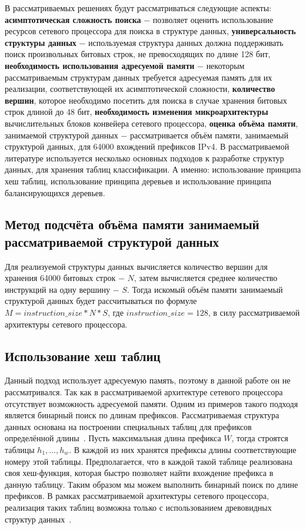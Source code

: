 \documentclass[conference]{IEEEtran}
\begin{document}
        В рассматриваемых решениях будут рассматриваться следующие аспекты:
        {\bf асимптотическая сложность поиска} $-$ позволяет оценить использование 
        ресурсов сетевого процессора для поиска в структуре данных,
        {\bf универсальность структуры данных} $-$ используемая структура данных
        должна поддерживать поиск произвольных битовых строк, не превосходящих по длине 128 бит,
        {\bf необходимость использования адресуемой памяти} $-$ некоторым рассматриваемым 
        структурам данных требуется адресуемая память для их реализации, 
        соответствующей их асимптотической сложности,
        {\bf количество вершин}, которое необходимо посетить для поиска
        в случае хранения битовых строк длиной до 48 бит,
        {\bf необходимость изменения микроархитектуры} вычислительных блоков конвейера 
        сетевого процессора,
        {\bf оценка объёма памяти}, занимаемой структурой данных $-$ рассматривается объём памяти, занимаемый структурой данных, для 64000 вхождений префиксов IPv4.
        В рассматриваемой литературе используется несколько основных подходов к разработке структур данных, 
        для хранения таблиц классификации. А именно: использование принципа хеш таблиц, использование принципа деревьев 
        и использование принципа балансирующихся деревьев.

    \subsection{Метод подсчёта объёма памяти занимаемый рассматриваемой структурой данных}
        Для реализуемой структуры данных вычисляется количество вершин для хранения 64000 битовых строк $-$ $N$, затем вычисляется среднее количество инструкций на 
        одну вершину $-$ $S$. Тогда искомый объём памяти занимаемый структурой данных будет рассчитываться по формуле $M = instruction\_size * N * S$,
        где $instruction\_size = 128$, в силу рассматриваемой архитектуры сетевого процессора.
    \subsection{Использование хеш таблиц}
        Данный подход использует адресуемую память, поэтому в данной работе он не рассматривался. 
        Так как в рассматриваемой архитектуре сетевого процессора отсутствует возможность адресуемой памяти.
        Одним из примеров такого подходя является бинарный поиск по длинам префиксов.
        Рассматриваемая структура данных основана на построении специальных таблиц для префиксов определённой длины~\cite{mun2006binary}. 
        Пусть максимальная длина префикса {\ttfamily $W$}, тогда строятся таблицы {\ttfamily $h_{1},\ldots,h_{w}$}. 
        В каждой из них хранятся префиксы длины соответствующие номеру этой таблицы. 
        Предполагается, что в каждой такой таблице реализована своя хеш-функция, 
        которая быстро позволяет найти вхождение префикса в данную таблицу.
        Таким образом мы можем выполнить бинарный поиск по длине префиксов. 
        В рамках рассматриваемой архитектуры сетевого процессора, 
        реализация таких таблиц возможна только с использованием древовидных структур данных~\cite{mun2006binary}. 
\end{document}
